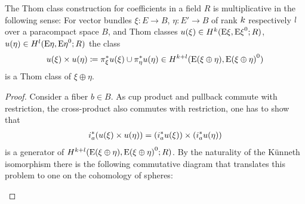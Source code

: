 \begin{Cor}\label{cor:thomclassmultiplicative}
  The Thom class construction for coefficients in a field $R$ is
  multiplicative in the following sense:
  For vector bundles $\xi\colon E\to B$, $\eta\colon E'\to B$
  of rank $k$ respectively $l$ over a paracompact space $B$, and Thom
  classes
  ${u}(\xi)\in H^{k}(\mathrm{E}\xi, {\mathrm{E}\xi}^0; R)$,
  ${u}(\eta)\in H^{l}(\mathrm{E}\eta, {\mathrm{E}\eta}^0; R)$
  the class
  \begin{gather*}
    {u}(\xi)\times{u}(\eta)
    \coloneqq {\pi}^*_\xi{u}(\xi) \cup {\pi}^*_\eta{u}(\eta)
    \in H^{k+l}(\mathrm{E}(\xi\oplus\eta), {\mathrm{E}(\xi\oplus\eta)}^0)
  \end{gather*}
  is a Thom class of $\xi\oplus\eta$.
  \begin{proof}
    Consider a fiber $b\in B$. As cup product and pullback commute
    with restriction, the cross-product also commutes with
    restriction, \idest one has to show that
    \begin{gather*}
      {i}^*_a({u}(\xi)\times{u}(\eta))
      = \left({i}^*_a{u}(\xi)\right)
      \times \left({i}^*_a{u}(\eta)\right)
    \end{gather*}
    is a generator of
    $H^{k+l}(\mathrm{E}(\xi\oplus\eta), {\mathrm{E}(\xi\oplus\eta)}^0;R)$.
    By the naturality of the Künneth isomorphism there is the
    following commutative diagram that translates this problem to one
    on the cohomology of spheres:
    \begin{center}
\end{center}
\end{proof}
\end{Cor}
